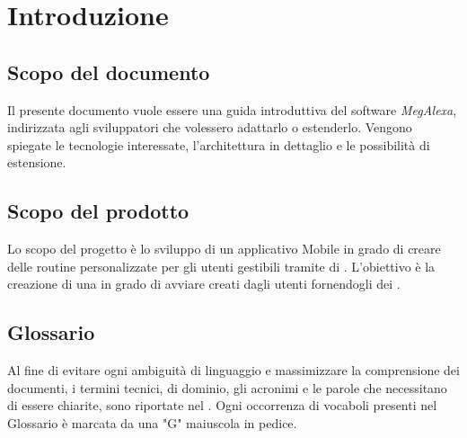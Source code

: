 \chapter{Introduzione}
\label{Introduzione}
\section{Scopo del documento}
Il presente documento vuole essere una guida introduttiva del software \textit{MegAlexa}, indirizzata agli sviluppatori che volessero adattarlo o estenderlo. Vengono spiegate le tecnologie interessate, l'architettura in dettaglio e le possibilità di estensione. 

\section{Scopo del prodotto}
Lo scopo del progetto è lo sviluppo di un applicativo Mobile in grado di creare delle routine personalizzate per gli utenti 
gestibili tramite  di . L’obiettivo è la creazione di una  in grado di avviare  creati dagli utenti fornendogli dei .

\section{Glossario}
Al fine di evitare ogni ambiguità di linguaggio e massimizzare la comprensione dei documenti, i termini tecnici, di dominio, gli acronimi e le parole che necessitano di essere chiarite, sono riportate nel \glossariodocumento.
Ogni occorrenza di vocaboli presenti nel Glossario è marcata da una "G" maiuscola in pedice.


